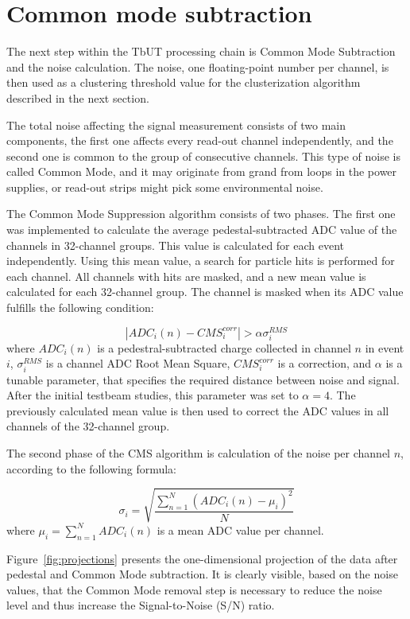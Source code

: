 \section{Common mode subtraction}
The next step within the TbUT processing chain is Common Mode Subtraction and the noise calculation. The noise, one floating-point number per channel,  is then used as a clustering threshold value for the clusterization algorithm described in the next section. 


The total noise affecting the signal measurement consists of two main components,  the first one affects every read-out channel independently, and the second one is common to the group of consecutive channels. This type of noise is called Common Mode, and it may originate from grand from loops in the power supplies, or read-out strips might pick some environmental noise. 

The Common Mode Suppression algorithm consists of two phases. The first one was implemented to calculate the average pedestal-subtracted ADC value of the channels in 32-channel groups. This value is calculated for each event independently. Using this mean value, a search for particle hits is performed for each channel. All channels with hits are masked, and a new mean value is calculated for each 32-channel group. The channel is masked when its ADC value fulfills the following condition:

\begin{equation}
    |ADC_{i}(n)-CMS^{corr}_{i}| > \alpha \sigma^{RMS}_{i}
\end{equation}
where $ADC_{i}(n)$ is a pedestral-subtracted charge collected in channel $n$ in event $i$, $\sigma^{RMS}_{i}$ is a channel ADC Root Mean Square, $CMS^{corr}_{i} $ is a correction, and $\alpha$ is a tunable parameter, that specifies the required distance between noise and signal. After the initial testbeam studies, this parameter was set to $\alpha = 4$. 
The previously calculated mean value is then used to correct the ADC values in all channels of the 32-channel group.

The second phase of the CMS algorithm is calculation of the noise per channel $n$, according to the following formula: 

\begin{equation}
    \sigma_i  = \sqrt{\frac{\sum_{n=1}^{N} (ADC_{i}(n)-\mu_{i})^2}{N}}
\end{equation}
where $\mu_{i} = \sum_{n=1}^{N} ADC_{i}(n)$ is a mean ADC value per channel. 


Figure~\ref{fig:projections} presents the one-dimensional projection of the data after pedestal and Common Mode subtraction. It is clearly visible, based on the noise values, that the Common Mode removal step is necessary to reduce the noise level and thus increase the Signal-to-Noise (S/N) ratio. 

